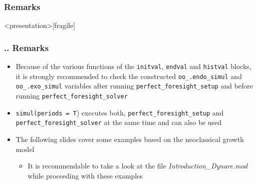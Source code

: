\documentclass[11pt,aspectratio=169]{beamer}
\begin{document}
\subsubsection{Remarks}
\begin{frame}<presentation>[fragile]
	\frametitle{{\thesection.\thesubsection.\thesubsubsection} Remarks}
	\begin{itemize}
		\item Because of the various functions of the \texttt{initval}, \texttt{endval} and \texttt{histval} blocks, it is strongly recommended to check the constructed \texttt{oo\_.endo\_simul} and \texttt{oo\_.exo\_simul} variables after running \texttt{perfect\_foresight\_setup} and before running \texttt{perfect\_foresight\_solver} 
		\item \texttt{simul(periods = T}) executes both,  \texttt{perfect\_foresight\_setup} and \linebreak \texttt{perfect\_foresight\_solver} at the same time and can also be used
		\item The following slides cover some examples based on the neoclassical growth model 
		\begin{itemize}
			\item It is recommendable to take a look at the file \textit{Introduction\_Dynare.mod} while proceeding with these examples
		\end{itemize}
	\end{itemize}
\end{frame}
\end{document}
